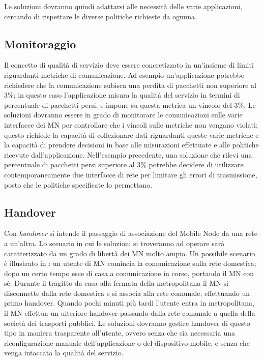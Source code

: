 \documentclass[12pt,a4paper,openright,twoside]{book}
\begin{document}
Le soluzioni dovranno quindi adattarsi alle necessità delle varie
applicazioni, cercando di rispettare le diverse politiche richieste da
ognuna.

\subsection{Monitoraggio}
Il concetto di qualità di servizio deve essere concretizzato in
un'insieme di limiti riguardanti metriche di comunicazione. Ad esempio
un'applicazione potrebbe richiedere che la comunicazione subisca una
perdita di pacchetti non superiore al 3\%; in questo caso
l'applicazione misura la qualità del servizio in termini di
percentuale di pacchetti persi, e impone su questa metrica un vincolo
del 3\%. Le soluzioni dovranno essere in grado di monitorare le
comunicazioni sulle varie interfacce dei MN per controllare che i
vincoli sulle metriche non vengano violati; questo richiede la
capacità di collezionare dati riguardanti queste varie metriche e la
capacità di prendere decisioni in base alle misurazioni effettuate e
alle politiche ricevute dall'applicazione. Nell'esempio precedente,
una soluzione che rilevi una percentuale di pacchetti persi superiore
al 3\% potrebbe decidere di utilizzare contemporaneamente due
interfacce di rete per limitare gli errori di trasmissione, posto che
le politiche specificate lo permettano.

\subsection{Handover}
\label{sec:handover}
Con \emph{handover} si intende il passaggio di associazione del Mobile
Node da una rete a un'altra. Lo scenario in cui le soluzioni si
troveranno ad operare sarà caratterizzato da un grado di libertà dei
MN molto ampio. Un possibile scenario è illustrato in \cite{bib:abc}:
un utente di MN comincia la comunicazione sulla rete domestica; dopo
un certo tempo esce di casa a comunicazione in corso, portando il MN
con sè. Durante il tragitto da casa alla fermata della metropolitana
il MN si disconnette dalla rete domestica e si associa alla rete
comunale, effettuando un primo handover. Quando pochi minuti più tardi
l'utente entra in metropolitana, il MN effettua un ulteriore handover
passando dalla rete comunale a quella della società dei trasporti
pubblici. Le soluzioni dovranno gestire handover di questo tipo in
maniera trasparente all'utente, ovvero senza che sia necessaria una
riconfigurazione manuale dell'applicazione o del dispositivo mobile, e
senza che venga intaccata la qualità del servizio.
\end{document}
